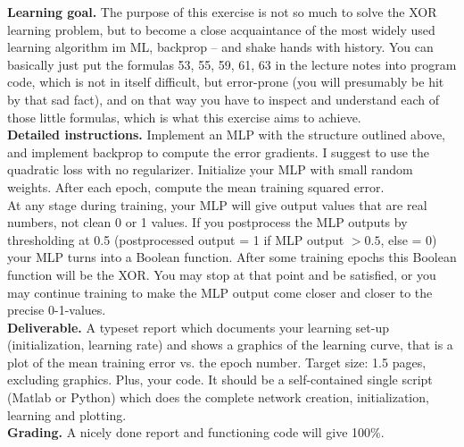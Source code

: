 \documentclass[12pt]{article}
\begin{document}
\noindent
\textbf{Learning goal.} The purpose of this exercise is not so much to solve the XOR learning problem, but to become a close acquaintance of the most widely used learning algorithm im ML, backprop – and shake hands with history. You can basically just put the formulas 53, 55, 59, 61, 63 in the lecture notes into program code, which is not in itself difficult, but error-prone (you will presumably be hit by that sad fact), and on that way you have to inspect and understand each of those little formulas, which is what this exercise aims to achieve.\\

\noindent
\textbf{Detailed instructions.} Implement an MLP with the structure outlined above, and implement backprop to compute the error gradients. I suggest to use the quadratic loss with no regularizer. Initialize your MLP with small random weights. After each epoch, compute the mean training squared error.\\
At any stage during training, your MLP will give output values that are real numbers, not clean 0 or 1 values. If you postprocess the MLP outputs by thresholding at 0.5 (postprocessed output = 1 if MLP output $> 0.5$, else = 0) your MLP turns into a Boolean function. After some training epochs this Boolean function will be the XOR. You may stop at that point and be satisfied, or you may continue training to make the MLP output come closer and closer to the precise 0-1-values.\\

\noindent
\textbf{Deliverable.} A typeset report which documents your learning set-up (initialization, learning rate) and shows a graphics of the learning curve, that is a plot of the mean training error vs. the epoch number. Target size: 1.5 pages, excluding graphics. Plus, your code. It should be a self-contained single script (Matlab or Python) which does the complete network creation, initialization, learning and plotting.\\

\noindent
\textbf{Grading.} A nicely done report and functioning code will give 100\%.\\
\end{document}
